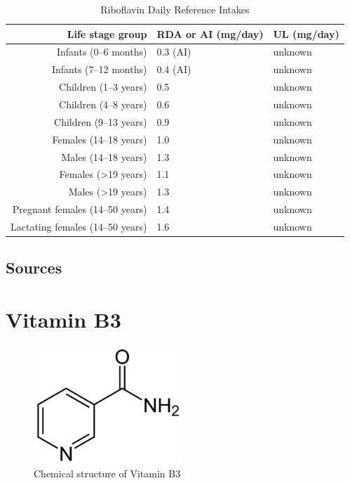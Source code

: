 \documentclass{book}
\begin{document}
\begin{table}[h]
	\caption{Riboflavin Daily Reference Intakes}
	\centering \begin{tabular}{| r | l | l |}
		\hline
		\textbf{Life stage group} & \textbf{RDA or AI (mg/day)} & \textbf{UL (mg/day)}\\ \hline
		Infants (0--6 months) & 0.3 (AI) & unknown\\ \hline
		Infants (7--12 months) & 0.4 (AI) & unknown\\ \hline
		Children (1--3 years) & 0.5 & unknown\\ \hline
		Children (4--8 years) & 0.6 & unknown\\ \hline
		Children (9--13 years) & 0.9 & unknown\\ \hline
		Females (14--18 years) & 1.0 & unknown\\ \hline
		Males (14--18 years) & 1.3 & unknown\\ \hline
		Females (\textgreater19 years) & 1.1 & unknown\\ \hline
		Males (\textgreater19 years) & 1.3 & unknown\\ \hline
		Pregnant females (14--50 years) & 1.4 & unknown\\ \hline
		Lactating females (14--50 years) & 1.6 & unknown\\ \hline
	\end{tabular}
\end{table}
\newpage

\section{Sources}


\chapter{Vitamin B3}
\begin{figure}[h]
	\caption{Chemical structure of Vitamin B3}
	\centering \includegraphics[width=0.5\textwidth]{images/Vitamin_B3_chemical_structure}
\end{figure}
\end{document}
